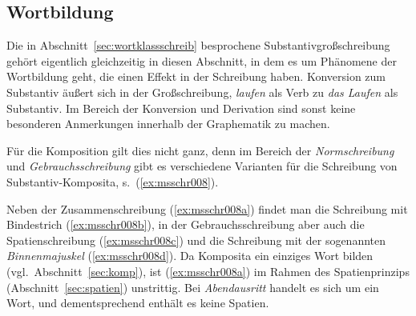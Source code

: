 \Stretch[0.5]

\subsection{Wortbildung}

\label{sec:wortbildschreib}

Die in Abschnitt~\ref{sec:wortklassschreib} besprochene Substantivgroßschreibung gehört eigentlich gleichzeitig in diesen Abschnitt, in dem es um Phänomene der Wortbildung geht, die einen Effekt in der Schreibung haben.
Konversion zum Substantiv äußert sich in der Großschreibung, \zB \textit{laufen} als Verb zu \textit{das Laufen} als Substantiv.
Im Bereich der Konversion und Derivation sind sonst keine besonderen Anmerkungen innerhalb der Graphematik zu machen.

Für die Komposition gilt dies nicht ganz, denn im Bereich der \textit{Normschreibung} und \textit{Gebrauchsschreibung} gibt es verschiedene Varianten für die Schreibung von Substantiv-Komposita, s.\ (\ref{ex:msschr008}).
\begin{exe}
  \ex\label{ex:msschr008} 
  \begin{xlist}
  \end{xlist}
\end{exe}

Neben der Zusammenschreibung (\ref{ex:msschr008a}) findet man die Schreibung mit Bindestrich (\ref{ex:msschr008b}), in der Gebrauchsschreibung aber auch die Spatienschreibung (\ref{ex:msschr008c}) und die Schreibung mit der sogenannten \textit{Binnenmajuskel} (\ref{ex:msschr008d}).
Da Komposita ein einziges Wort bilden (vgl.\ Abschnitt~\ref{sec:komp}), ist (\ref{ex:msschr008a}) im Rahmen des Spatienprinzips (Abschnitt~\ref{sec:spatien}) unstrittig.
Bei \textit{Abendausritt} handelt es sich um ein Wort, und dementsprechend enthält es keine Spatien.

